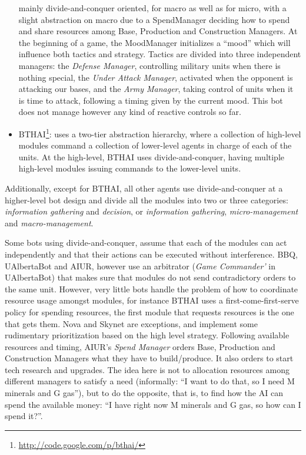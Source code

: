 \documentclass[journal]{IEEEtran}
\begin{document}
\begin{itemize}
  mainly divide-and-conquer oriented, for  macro as well as for micro,
  with a  slight abstraction on  macro due to a  SpendManager deciding
  how  to  spend  and  share  resources  among  Base,  Production  and
  Construction Managers.  At the beginning of a  game, the MoodManager
  initializes  a  ``mood''  which  will  influence  both  tactics  and
  strategy. Tactics  are divided into three  independent managers: the
  {\em  Defense Manager},  controlling  military units  when there  is
  nothing special, the {\em  Under Attack Manager}, activated when the
  opponent is attacking our bases,  and the {\em Army Manager}, taking
  control of units when it is time to attack, following a timing given
  by the  current mood. This bot  does not manage however  any kind of
  reactive controls so far.
\item  BTHAI\footnote{\url{http://code.google.com/p/bthai/}}:  uses  a
  two-tier  abstraction hierarchy,  where a  collection  of high-level
  modules command a collection of lower-level agents in charge of each
  of  the units.  At  the high-level,  BTHAI uses  divide-and-conquer,
  having   multiple  high-level  modules   issuing  commands   to  the
  lower-level units.
\end{itemize}

Additionally, except for BTHAI, all other agents use divide-and-conquer at a higher-level bot design and divide all the modules into two or three categories: {\em information gathering} and {\em decision}, or {\em information gathering}, {\em micro-management} and {\em macro-management}.

Some bots  using divide-and-conquer, assume  that each of  the modules
can act independently  and that their actions can  be executed without
interference.  BBQ,  UAlbertaBot and  AIUR, however use  an arbitrator
({\em Game Commander'} in UAlbertaBot) that makes sure that modules do
not send contradictory orders to  the same unit.  However, very little
bots handle  the problem of  how to coordinate resource  usage amongst
modules, for  instance BTHAI uses a  first-come-first-serve policy for
spending resources,  the first module  that requests resources  is the
one that gets them. Nova and Skynet are exceptions, and implement some
rudimentary prioritization based on the high level strategy. Following
available  resources and  timing,  AIUR's {\em  Spend Manager}  orders
Base,  Production   and  Construction  Managers  what   they  have  to
build/produce. It also orders to start tech research and upgrades. The
idea here is  not to allocation resources among  different managers to
satisfy a need (informally: ``I want  to do that, so I need M minerals
and G gas''), but to do the  opposite, that is, to find how the AI can
spend the available money: ``I have right now M minerals and G gas, so
how can I spend it?''.
\end{document}
